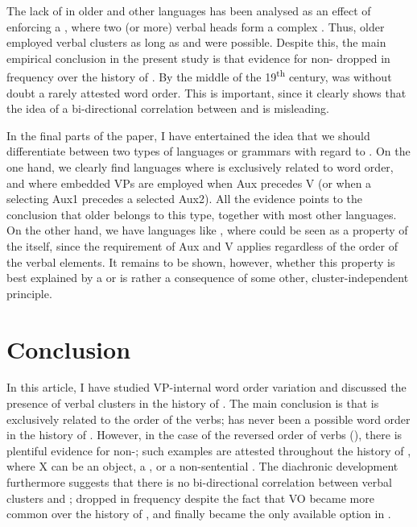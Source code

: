 \documentclass[output=paper, colorlinks, citecolor=brown]{langscibook}
\begin{document}
The lack of  in older  and other languages has been analysed as an effect of  enforcing a , where two (or more) verbal heads form a complex . Thus, older  employed verbal clusters as long as  and  were possible. Despite this, the main empirical conclusion in the present study is that evidence for non- dropped in frequency over the history of . By the middle of the 19\textsuperscript{th} century,  was without doubt a rarely attested word order. This is important, since it clearly shows that the idea of a bi-directional correlation between  and  is misleading.



In the final parts of the paper, I have entertained the idea that we should differentiate between two types of languages or grammars with regard to . On the one hand, we clearly find languages where  is exclusively related to  word order, and where embedded VPs are employed when Aux precedes V (or when a selecting  Aux1 precedes a selected  Aux2). All the evidence points to the conclusion that older  belongs to this type, together with most other  languages. On the other hand, we have languages like , where  could be seen as a property of the  itself, since the  requirement of Aux and V applies regardless of the order of the verbal elements. It remains to be shown, however, whether this property is best explained by a  or is rather a consequence of some other, cluster-independent principle.


\section{Conclusion}\label{sec:sangfelt:6}

In this article, I have studied VP-internal word order variation and discussed the presence of verbal clusters in the history of . The main conclusion is that  is exclusively related to the order of the verbs;  has never been a possible word order in the history of . However, in the case of the reversed order of verbs (), there is plentiful evidence for non-; such examples are attested throughout the history of , where X can be an object, a , or a non-sentential . The diachronic development furthermore suggests that there is no bi-directional correlation between verbal clusters and ;  dropped in frequency despite the fact that VO became more common over the history of , and finally became the only available option in .
\end{document}
